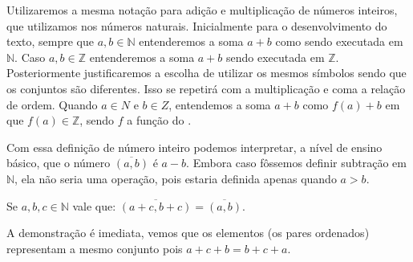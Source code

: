 \documentclass[../main.tex]{subfiles}
\begin{document}
\begin{obs}
    Utilizaremos a mesma notação para adição e multiplicação de números inteiros, que utilizamos nos números naturais. Inicialmente para o desenvolvimento do texto, sempre que $a,b \in \mathbb{N}$ entenderemos a soma $a+b$ como sendo executada em $\mathbb{N}$. Caso $a,b \in \mathbb{Z}$ entenderemos a soma $a+b$ sendo executada em $\mathbb{Z}$. Posteriormente justificaremos a escolha de utilizar os mesmos símbolos sendo que os conjuntos são diferentes. Isso se repetirá com a multiplicação e coma a relação de ordem. Quando $a \in N$ e $b \in Z$, entendemos a soma $a + b$ como $f(a) + b$ em que $f(a) \in \mathbb{Z}$, sendo $f$ a função do .
\end{obs}

Com essa definição de número inteiro podemos interpretar, a nível de ensino básico, que o número $\overline{(a,b)}$ é $a - b$. Embora caso fôssemos definir subtração em $\mathbb{N}$, ela não seria uma operação, pois estaria definida apenas quando $a > b$.

\begin{prop}\label{int-prop-cancelaCoordenadas}
    Se $a,b,c \in \mathbb{N}$ vale que: $\overline{(a+c,b+c)} = \overline{(a,b)}$.
\end{prop}
\begin{dem}
    A demonstração é imediata, vemos que os elementos (os pares ordenados) representam a mesmo conjunto pois $a+c+b = b+c+a$.
\end{dem}
\end{document}
